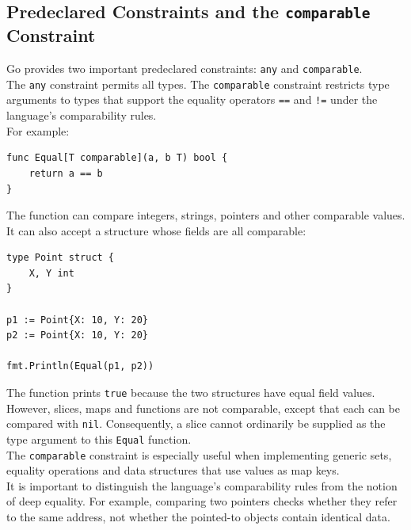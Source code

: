 \subsection{Predeclared Constraints and the \texttt{comparable} Constraint}

Go provides two important predeclared constraints: \texttt{any} and \texttt{comparable}.\\

The \texttt{any} constraint permits all types. The \texttt{comparable} constraint restricts type arguments to types that support the equality operators \texttt{==} and \texttt{!=} under the language's comparability rules.\\

For example:

\begin{lstlisting}
func Equal[T comparable](a, b T) bool {
    return a == b
}
\end{lstlisting}

The function can compare integers, strings, pointers and other comparable values.\\

It can also accept a structure whose fields are all comparable:

\begin{lstlisting}
type Point struct {
    X, Y int
}

p1 := Point{X: 10, Y: 20}
p2 := Point{X: 10, Y: 20}

fmt.Println(Equal(p1, p2))
\end{lstlisting}

The function prints \texttt{true} because the two structures have equal field values.\\

However, slices, maps and functions are not comparable, except that each can be compared with \texttt{nil}. Consequently, a slice cannot ordinarily be supplied as the type argument to this \texttt{Equal} function.\\

The \texttt{comparable} constraint is especially useful when implementing generic sets, equality operations and data structures that use values as map keys.\\

It is important to distinguish the language's comparability rules from the notion of deep equality. For example, comparing two pointers checks whether they refer to the same address, not whether the pointed-to objects contain identical data.

